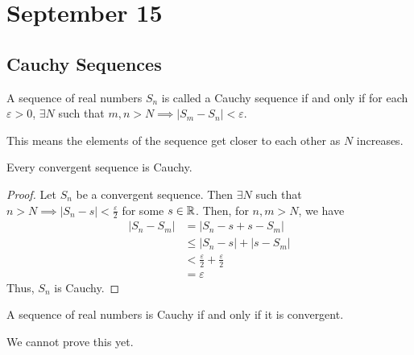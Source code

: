\section{September 15}

\subsection{Cauchy Sequences}
\begin{definition}
    A sequence of real numbers $S_n$ is called a Cauchy sequence if and only if for each $\varepsilon > 0$, $\exists N$ such that $m, n > N \implies |S_m - S_n| < \varepsilon$.
\end{definition}
\begin{remark}
    This means the elements of the sequence get closer to each other as $N$ increases.
\end{remark}

\begin{theorem}
    Every convergent sequence is Cauchy.
\end{theorem}
\begin{proof}
    Let $S_n$ be a convergent sequence. Then $\exists N$ such that $n > N \implies |S_n - s| < \frac{\varepsilon}{2}$ for some $s \in \mathbb{R}$. Then, for $n, m > N$, we have
    \begin{align*}
        |S_n - S_m| &= |S_n - s + s - S_m| \\
        &\leq |S_n - s| + |s - S_m| \\
        &< \frac{\varepsilon}{2} + \frac{\varepsilon}{2} \\
        &= \varepsilon
    \end{align*}
    Thus, $S_n$ is Cauchy.
\end{proof}

\begin{theorem}
    A sequence of real numbers is Cauchy if and only if it is convergent.
\end{theorem}
\begin{remark}
    We cannot prove this yet.
\end{remark}